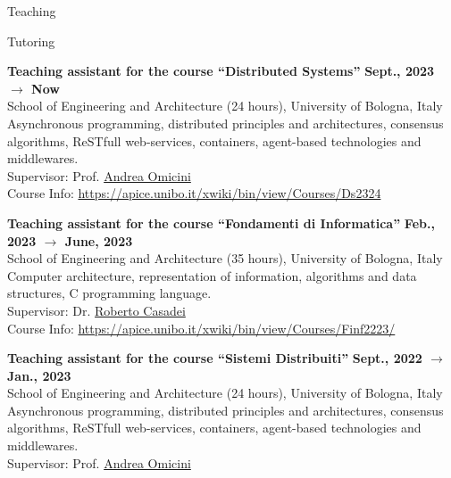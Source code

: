 \documentclass{resume} %
\begin{document}
    \begin{rSection}{Teaching}


        \begin{rSubsection2}{Tutoring}
            \item\textbf{ Teaching assistant for the course ``Distributed Systems'' }\hfill \textbf{Sept., 2023 $\rightarrow$ Now}
            \\School of Engineering and Architecture (24 hours), University of Bologna, Italy
            \\Asynchronous programming, distributed principles and architectures, consensus algorithms, ReSTfull web-services, containers, agent-based technologies and middlewares.
            \\Supervisor: Prof. \href{mailto:andrea.omicini@unibo.it}{Andrea Omicini}
            \\Course Info: \url{https://apice.unibo.it/xwiki/bin/view/Courses/Ds2324}
            \item\textbf{ Teaching assistant for the course ``Fondamenti di Informatica'' }\hfill \textbf{Feb., 2023 $\rightarrow$ June, 2023}
            \\School of Engineering and Architecture (35 hours), University of Bologna, Italy
            \\Computer architecture, representation of information, algorithms and data structures, C programming language.
            \\Supervisor: Dr. \href{mailto:roberto.casadei@unibo.it}{Roberto Casadei}
            \\Course Info: \url{https://apice.unibo.it/xwiki/bin/view/Courses/Finf2223/}
            \item\textbf{ Teaching assistant for the course ``Sistemi Distribuiti'' }\hfill \textbf{Sept., 2022 $\rightarrow$ Jan., 2023}
            \\School of Engineering and Architecture (24 hours), University of Bologna, Italy
            \\Asynchronous programming, distributed principles and architectures, consensus algorithms, ReSTfull web-services, containers, agent-based technologies and middlewares.
            \\Supervisor: Prof. \href{mailto:andrea.omicini@unibo.it}{Andrea Omicini}

\end{rSubsection2}
\end{rSection}
\end{document}
